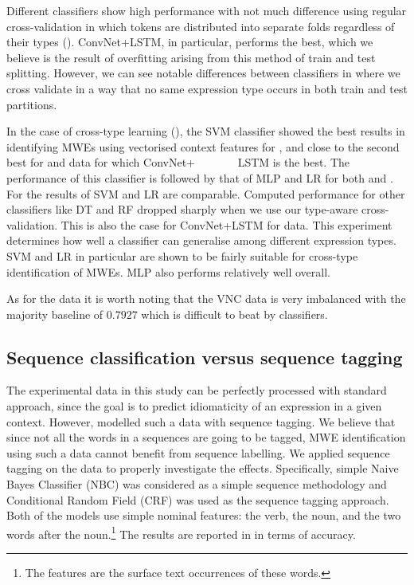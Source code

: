 \documentclass[output=paper,modfonts,nonflat]{langsci/langscibook}
\begin{document}
Different classifiers show high performance with not much difference using regular cross-validation in which tokens are distributed into separate folds regardless of their types (). ConvNet+LSTM, in particular, performs the best, %
which we believe is the result of overfitting arising from this method of train and test splitting. 
However, we can see notable differences between classifiers in  where we cross validate in a way that no same expression type occurs in both train and test partitions. %

In the case of cross-type learning (), the SVM classifier showed the best results in identifying MWEs using vectorised context features for , and close to the second best for  and  data for which ConvNet+ ~~~~~~~LSTM is the best. The performance of this classifier is followed by that of MLP and LR for both  and . For  the results of SVM and LR are comparable. Computed performance for other classifiers like DT and RF dropped sharply when we use our type-aware cross-validation.
This is also the case for ConvNet+LSTM for  data.
This experiment determines how well a classifier can generalise among different expression types. SVM and LR in particular are shown to be fairly suitable for cross-type identification of MWEs. MLP also performs relatively well overall. 

As for the  data it is worth noting that the VNC data is very imbalanced with the majority baseline of $0.7927$ which is difficult to beat by classifiers. 



\subsection{Sequence classification versus sequence tagging}
\label{sec:res2}
The experimental data in this study can be perfectly processed with standard  approach, since the goal is to predict idiomaticity of an expression in a given context. However, \cite{scholivet-ramisch:2017:MWE2017} modelled such a data with sequence tagging. We believe that since not all the words in a sequences are going to be tagged, MWE identification using such a data cannot benefit from sequence labelling. 
We applied sequence tagging on the data to properly investigate the effects. Specifically, simple Naive Bayes Classifier (NBC) was considered as a simple sequence  methodology and Conditional Random Field (CRF) was used as the sequence tagging approach. Both of the models use simple nominal features: the verb, the noun, and the two words after the noun.\footnote{The features are the surface text occurrences of these words.} The results are reported in  in terms of accuracy.
\end{document}
